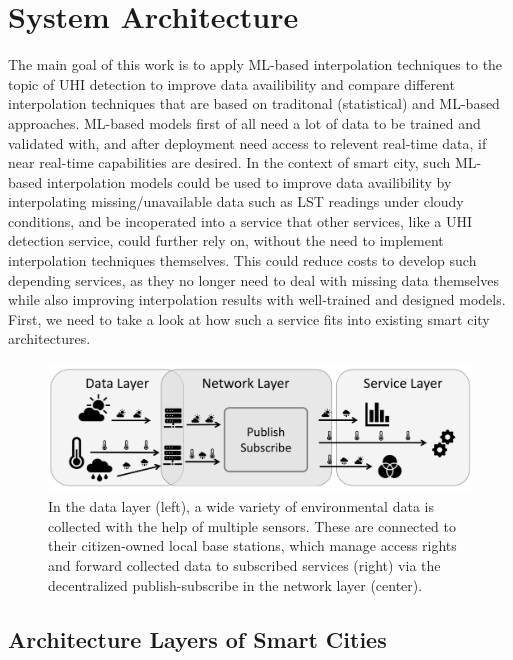 \chapter{System Architecture}
\label{chap:System Architecture}

The main goal of this work is to apply ML-based interpolation techniques to the topic of UHI detection to improve data availibility and compare different interpolation techniques that are based on traditonal (statistical) and ML-based approaches. ML-based models first of all need a lot of data to be trained and validated with, and after deployment need access to relevent real-time data, if near real-time capabilities are desired. In the context of smart city, such ML-based interpolation models could be used to improve data availibility by interpolating missing/unavailable data such as LST readings under cloudy conditions, and be incoperated into a service that other services, like a UHI detection service, could further rely on, without the need to implement interpolation techniques themselves. This could reduce costs to develop such depending services, as they no longer need to deal with missing data themselves while also improving interpolation results with well-trained and designed models. First, we need to take a look at how such a service fits into existing smart city architectures.

\begin{figure}[h]
    \centering
    \includegraphics[width=\textwidth]{images/expose-system-architecture.png}
    \caption{In the data layer (left), a wide variety of environmental data is collected with the help of multiple sensors. These are connected to their citizen-owned local base stations, which manage access rights and forward collected data to subscribed services (right) via the decentralized publish-subscribe in the network layer (center).}
    \label{fig:system-architecture-overview} %
\end{figure}

\section{Architecture Layers of Smart Cities}

